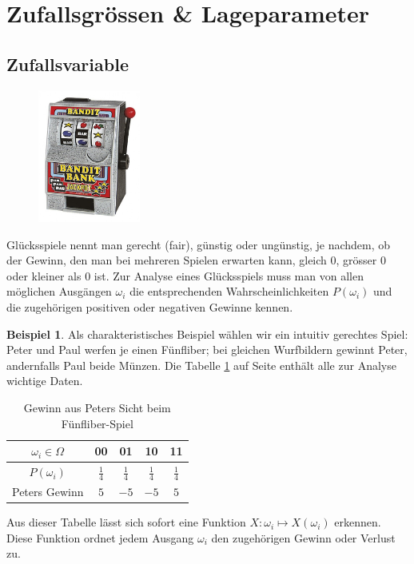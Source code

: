 \documentclass[%
<<<<<<< Updated upstream
11pt,%
twoside,%
titlepage,%
german,%
=======
11pt,%
twoside,%
titlepage,%
swissgerman,%
>>>>>>> Stashed changes
headsepline%
]{scrartcl}
\newcommand{\spaltenheight}{\rule{0mm}{3ex}}
\newcommand{\spaltensep}{\\[1ex]}
\theoremstyle{definition}
\newtheorem{bsp}{Beispiel}[subsection] %
\theoremstyle{plain}
\newcounter{theo}[section]\setcounter{theo}{0}
\begin{document}
\clearpage

\section{Zufallsgrössen \& Lageparameter}

\subsection{Zufallsvariable}
\begin{figure}
  \begin{center}
    \includegraphics[width=0.3\textwidth]{pictures/bandit}
  \end{center}
\end{figure}
Glücksspiele nennt man gerecht (fair), günstig oder ungünstig, je nachdem, ob der Gewinn, den man bei mehreren Spielen erwarten kann, gleich $0$, grösser $0$ oder kleiner als $0$ ist. Zur Analyse eines Glücksspiels muss man von allen möglichen Ausgängen $\omega_i$ die entsprechenden Wahrscheinlichkeiten $P(\omega_i)$ und die zugehörigen positiven oder negativen Gewinne kennen.

\begin{bsp}
Als charakteristisches Beispiel wählen wir ein intuitiv gerechtes Spiel: Peter und Paul werfen je einen Fünfliber; bei gleichen Wurfbildern gewinnt Peter, andernfalls Paul beide Münzen.
Die Tabelle \ref{tab:5liber} auf Seite \pageref{tab:5liber} enthält alle zur Analyse wichtige Daten.

\begin{table}
\begin{center}
\begin{tabular}{|c|c|c|c|c|}
\hline
\rowcolor{Gray}\spaltenheight $\omega_i\in\Omega$ & 00 & 01 & 10 & 11\spaltensep \hline
\rowcolor{lightyellow}\spaltenheight $P(\omega_i)$ & $\frac{1}{4}$ & $\frac{1}{4}$ & $\frac{1}{4}$ & $\frac{1}{4}$\spaltensep \hline
\rowcolor{Gray}\spaltenheight Peters Gewinn & $5$ & $-5$ & $-5$ & $5$\spaltensep \hline
\end{tabular}
\end{center}
\caption{Gewinn aus Peters Sicht beim Fünfliber-Spiel}\label{tab:5liber}
\end{table}
\end{bsp}
Aus dieser Tabelle lässt sich sofort eine Funktion $X:\omega_i\mapsto X(\omega_i)$
erkennen. Diese Funktion ordnet jedem Ausgang $\omega_i$ den zugehörigen Gewinn oder Verlust zu.
\end{document}
